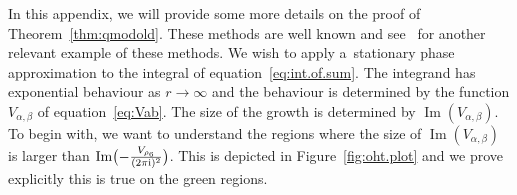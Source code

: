 \documentclass[pdftex]{sigma}
\numberwithin{equation}{section}
\def\Im{\operatorname{Im}}
\begin{document}
In this appendix, we will provide some more details on the proof of Theorem~\ref{thm:qmodold}. These methods are well known and see~\cite{Ohtsuki:VCYVC} for another relevant example of these methods. We wish to apply a~stationary phase approximation to the integral of equation~\eqref{eq:int.of.sum}. The integrand has exponential behaviour as $r\to\infty$ and the behaviour is determined by the function $V_{\alpha,\beta}$ of equation~\eqref{eq:Vab}. The size of the growth is determined by $\Im(V_{\alpha,\beta})$. To begin with, we want to understand the regions where the size of $\Im(V_{\alpha,\beta})$ is larger than $\Im\bigl(-\frac{V_{\rho_6}}{(2\pi {\rm i})^2}\bigr)$. This is depicted in Figure~\ref{fig:oht.plot} and we prove explicitly this is true on the green regions.
\begin{figure}[t]\centering
{}
\end{figure}
\end{document}
